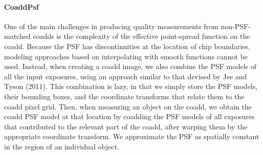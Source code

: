 \documentclass[12pt]{article}
\begin{document}
\paragraph{CoaddPsf}
\label{alg:coaddPsf}

One of the main challenges in producing quality measurements from
non-PSF-matched coadds is the complexity of the effective point-spread
function on the coadd.  Because the PSF has discontinuities at the
location of chip boundaries, modeling approaches based on
interpolating with smooth functions cannot be used.  Instead, when
creating a coadd image, we also combine the PSF models of all the
input exposures, using an approach similar to that devised by
Jee and Tyson (2011).  This combination is lazy, in that we simply store the
PSF models, their bounding boxes, and the coordinate transforms that
relate them to the coadd pixel grid.  Then, when measuring an object
on the coadd, we obtain the coadd PSF model at that location by coadding the
PSF models of all exposures that contributed to the relevant part of
the coadd, after warping them by the appropriate coordinate
transform.  We approximate the PSF as spatially constant in the region
of an individual object.

\end{document}
